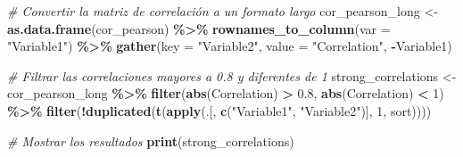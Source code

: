 \documentclass[notspecified,article,submit,moreauthors,pdftex]{Definitions/mdpi}
\newenvironment{Shaded}{\begin{snugshade}}{\end{snugshade}}
\newcommand{\AttributeTok}[1]{\textcolor[rgb]{0.13,0.29,0.53}{#1}}
\newcommand{\CommentTok}[1]{\textcolor[rgb]{0.56,0.35,0.01}{\textit{#1}}}
\newcommand{\DecValTok}[1]{\textcolor[rgb]{0.00,0.00,0.81}{#1}}
\newcommand{\FloatTok}[1]{\textcolor[rgb]{0.00,0.00,0.81}{#1}}
\newcommand{\FunctionTok}[1]{\textcolor[rgb]{0.13,0.29,0.53}{\textbf{#1}}}
\newcommand{\NormalTok}[1]{#1}
\newcommand{\OtherTok}[1]{\textcolor[rgb]{0.56,0.35,0.01}{#1}}
\newcommand{\SpecialCharTok}[1]{\textcolor[rgb]{0.81,0.36,0.00}{\textbf{#1}}}
\newcommand{\StringTok}[1]{\textcolor[rgb]{0.31,0.60,0.02}{#1}}
\begin{document}
\begin{Shaded}
\begin{Highlighting}[]
\CommentTok{\# Convertir la matriz de correlación a un formato largo}
\NormalTok{cor\_pearson\_long }\OtherTok{\textless{}{-}} \FunctionTok{as.data.frame}\NormalTok{(cor\_pearson) }\SpecialCharTok{\%\textgreater{}\%}
  \FunctionTok{rownames\_to\_column}\NormalTok{(}\AttributeTok{var =} \StringTok{"Variable1"}\NormalTok{) }\SpecialCharTok{\%\textgreater{}\%}
  \FunctionTok{gather}\NormalTok{(}\AttributeTok{key =} \StringTok{"Variable2"}\NormalTok{, }\AttributeTok{value =} \StringTok{"Correlation"}\NormalTok{, }\SpecialCharTok{{-}}\NormalTok{Variable1)}

\CommentTok{\# Filtrar las correlaciones mayores a 0.8 y diferentes de 1}
\NormalTok{strong\_correlations }\OtherTok{\textless{}{-}}\NormalTok{ cor\_pearson\_long }\SpecialCharTok{\%\textgreater{}\%}
  \FunctionTok{filter}\NormalTok{(}\FunctionTok{abs}\NormalTok{(Correlation) }\SpecialCharTok{\textgreater{}} \FloatTok{0.8}\NormalTok{, }\FunctionTok{abs}\NormalTok{(Correlation) }\SpecialCharTok{\textless{}} \DecValTok{1}\NormalTok{) }\SpecialCharTok{\%\textgreater{}\%}
  \FunctionTok{filter}\NormalTok{(}\SpecialCharTok{!}\FunctionTok{duplicated}\NormalTok{(}\FunctionTok{t}\NormalTok{(}\FunctionTok{apply}\NormalTok{(.[, }\FunctionTok{c}\NormalTok{(}\StringTok{"Variable1"}\NormalTok{, }\StringTok{"Variable2"}\NormalTok{)], }\DecValTok{1}\NormalTok{, sort))))}

\CommentTok{\# Mostrar los resultados}
\FunctionTok{print}\NormalTok{(strong\_correlations)}
\end{Highlighting}
\end{Shaded}
\end{document}
